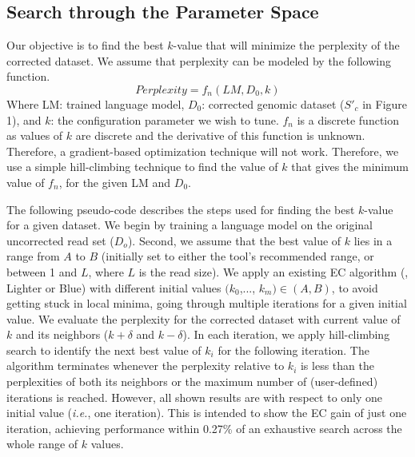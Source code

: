 \subsection{Search through the Parameter Space}
Our objective is to find the best $k$-value that will minimize the perplexity of the corrected dataset. We assume that perplexity can be modeled by the following function.
\begin{equation}
Perplexity = f_{n}(LM, D_0, k)
\end{equation} 
Where LM: trained language model, $D_0$: corrected genomic dataset ($S'_c$ in Figure 1), and $k$: the configuration parameter we wish to tune.
$f_{n}$ is a discrete function as values of $k$ are discrete and the derivative of this function is unknown. Therefore, a gradient-based optimization technique will not work. Therefore, we use a simple hill-climbing technique to find the value of $k$ that gives the minimum value of $f_n$, for the given LM and $D_0$.

The following pseudo-code describes the steps used for finding the best $k$-value for a given dataset. We begin by training a language model on the original uncorrected read set ($D_o$). Second, we assume that the best value of $k$ lies in a range from $A$ to $B$ (initially set to either the tool's recommended range, or between 1 and $L$, where $L$ is the read size).
We apply an existing EC algorithm (\eg, Lighter or Blue) with different initial values $(k_{0}$,..., $k_{m}) \in (A, B)$, to avoid getting stuck in local minima, going through multiple iterations for a given initial value. We evaluate the perplexity for the corrected dataset with current value of $k$ and its neighbors ($k+\delta$ and $k-\delta$). In each iteration, we apply hill-climbing search to identify the next best value of $k_{i}$ for the following iteration. The algorithm terminates whenever the perplexity relative to $k_i$ is less than the perplexities of both its neighbors or the maximum number of (user-defined) iterations is reached. However, all shown results are with respect to only one initial value (\textit{i.e.}, one iteration). This is intended to show the EC gain of just one iteration, achieving performance within 0.27\% of an exhaustive search across the whole range of $k$ values. %



